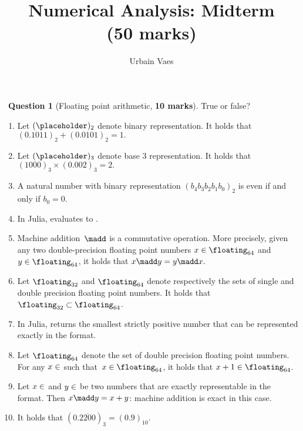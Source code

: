 \documentclass[10pt]{article}
\theoremstyle{definition}
\newtheorem{question}{{\normalfont \faGears}~Question}
\theoremstyle{remark}
\begin{document}
\title{Numerical Analysis: Midterm \\
\small{(\textbf{50 marks})}}
\author{Urbain Vaes}
\maketitle

\begin{question}
    [Floating point arithmetic, \textbf{10 marks}]
    True or false?
    \begin{enumerate}
        \item
            Let $(\placeholder)_2$ denote binary representation.
            It holds that
            \(
                (0.1011)_2 + (0.0101)_2 = 1.
            \)

        \item
            Let $(\placeholder)_3$ denote base 3 representation.
            It holds that
            \(
                (1000)_3 \times (0.002)_3 = 2.
            \)

        \item
            A natural number with binary representation $(b_4 b_3 b_2 b_1 b_0)_2$ is even if and only if $b_0 = 0$.

        \item
            In Julia,  evaluates to .

        \item
            Machine addition~$\madd$ is a commutative operation.
            More precisely, given any two double-precision floating point numbers $x \in \floating_{64}$ and $y \in \floating_{64}$,
            it holds that
            \(
                x \madd y = y \madd x.
            \)

        \item
            Let $\floating_{32}$ and $\floating_{64}$ denote respectively the sets of single and double precision floating point numbers.
            It holds that $\floating_{32} \subset \floating_{64}$.

        \item
            In Julia,  returns the smallest strictly positive number that can be represented exactly in the  format.

        \item
            Let $\floating_{64}$ denote the set of double precision floating point numbers.
            For any $x \in \real$ such that~$x \in \floating_{64}$,
            it holds that $x + 1 \in \floating_{64}$.

        \item
            Let $x \in \real$ and $y \in \real$ be two numbers that are exactly representable in the  format.
            Then $x \madd y = x + y$: machine addition is exact in this case.

        \item
            It holds that $(0.\overline{2200})_3 = (0.9)_{10}$.
    \end{enumerate}
\end{question}
\end{document}
